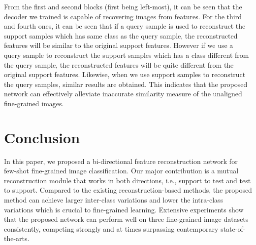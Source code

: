 \documentclass[letterpaper]{article} %
\begin{document}
From the first and second {blocks} (first being left-most), it can be seen that the decoder we trained is capable of recovering images from features. For the third {and fourth ones}, it can be seen that if  a query sample is used to reconstruct the support samples which has same class as the query sample, the reconstructed features will be similar to the original support features. However if we use a query sample to reconstruct the support samples which has a class different from the query sample, the reconstructed features will be quite different from the original support features. Likewise, when we use support samples to reconstruct the query samples, similar results are obtained. This indicates that the proposed network can effectively alleviate inaccurate similarity measure of the unaligned fine-grained images.


\section{Conclusion}
\label{Conclusion}
In this paper, we proposed a bi-directional feature reconstruction network for few-shot fine-grained image classification. Our major contribution is a mutual reconstruction module that works in both directions, i.e., support to test and test to support. Compared to the existing reconstruction-based methods, the proposed method can achieve larger inter-class variations and lower the intra-class variations which is crucial to fine-grained learning.
Extensive experiments show that the proposed network can perform well on {three} fine-grained image datasets consistently, competing strongly and at times surpassing contemporary state-of-the-arts.

\end{document}
